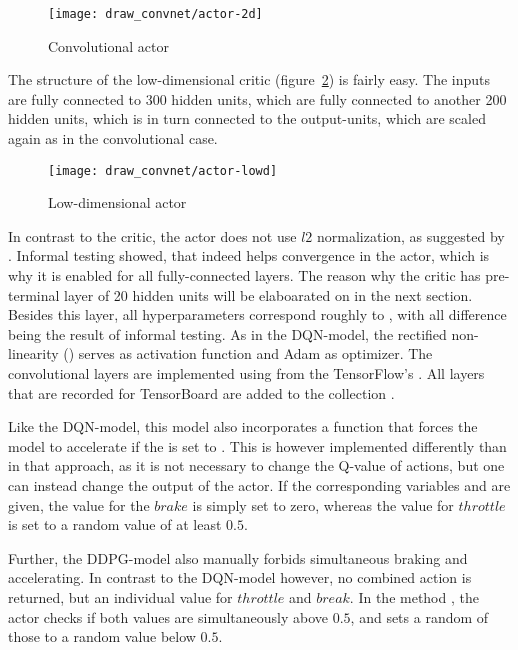 \begin{figure}[h]
	\centering 
	\texttt{[image: draw\_convnet/actor-2d]}
	\caption{Convolutional actor}
	\label{fig:2dact}
\end{figure}

The structure of the low-dimensional critic (figure~\ref{fig:lowdact}) is fairly easy. The inputs are fully connected to 300 hidden units, which are fully connected to another 200 hidden units, which is in turn connected to the output-units, which are scaled again as in the convolutional case. 

\begin{figure}[h]
	\centering 
	\texttt{[image: draw\_convnet/actor-lowd]}
	\caption{Low-dimensional actor}
	\label{fig:lowdact}
\end{figure}

In contrast to the critic, the actor does not use $l2$ normalization, as suggested by \cite{lillicrap_continuous_2015}. Informal testing showed, that \batchnorm indeed helps convergence in the actor, which is why it is enabled for all fully-connected layers. The reason why the critic has pre-terminal layer of 20 hidden units will be elaboarated on in the next section. Besides this layer, all hyperparameters correspond roughly to \cite{lillicrap_continuous_2015}, with all difference being the result of informal testing. As in the DQN-model, the rectified non-linearity () serves as activation function and Adam\cite{kingma_adam:_2014} as optimizer. The convolutional layers are implemented using  from the TensorFlow's . All layers that are recorded for TensorBoard are added to the collection .

Like the DQN-model, this model also incorporates a function that forces the model to accelerate if the  is set to . This is however implemented differently than in that approach, as it is not necessary to change the Q-value of actions, but one can instead change the output of the actor. If the corresponding variables  and  are given, the value for the $brake$ is simply set to zero, whereas the value for $throttle$ is set to a random value of at least $0.5$. 

Further, the DDPG-model also manually forbids simultaneous braking and accelerating. In contrast to the DQN-model however, no combined action is returned, but an individual value for $throttle$ and $break$. In the method , the actor checks if both values are simultaneously above $0.5$, and sets a random of those to a random value below $0.5$.

